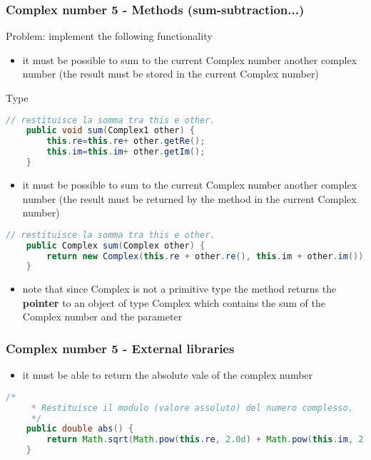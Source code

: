 \documentclass{article}
\begin{document}
\subsubsection{Complex number 5 - Methods (sum-subtraction...)}
Problem: implement the following functionality
\begin{itemize}
\item it must be possible to sum to the current  Complex number another complex number (the result must be stored in the current Complex number)
\end{itemize}
Type
\begin{lstlisting}[language=Java,escapechar=|]
	// restituisce la somma tra this e other.
	public void sum(Complex1 other) {
		this.re=this.re+ other.getRe();
		this.im=this.im+ other.getIm();
	}
\end{lstlisting}
\begin{itemize}
\item it must be possible to sum to the current  Complex number another complex number (the result must be returned by the method in the current Complex number)
\end{itemize}

\begin{lstlisting}[language=Java,escapechar=|]
		// restituisce la somma tra this e other.
	public Complex sum(Complex other) {
		return new Complex(this.re + other.re(), this.im + other.im());
	}
\end{lstlisting}
\begin{itemize}
\item  note that since Complex is not a primitive type the method returns the \textbf{pointer} to an object of type Complex which contains
the sum of the Complex number and the parameter
\end{itemize}

\subsubsection{Complex number 5 - External libraries}
\begin{itemize}
\item it must be able to return the absolute vale of the complex number 
\end{itemize}

\begin{lstlisting}[language=Java,escapechar=|]
/*
	 * Restituisce il modulo (valore assoluto) del numero complesso.
	 */
	public double abs() {
		return Math.sqrt(Math.pow(this.re, 2.0d) + Math.pow(this.im, 2.0d));
	}
\end{lstlisting}
\end{document}

